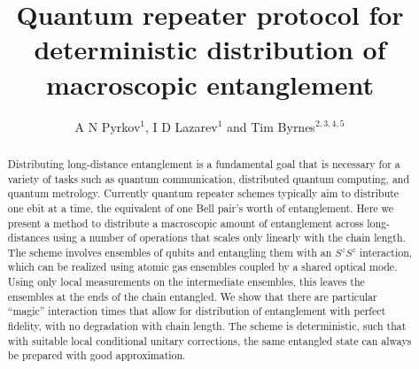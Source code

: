 \documentclass[12pt]{iopart}
\begin{document}
\title{Quantum repeater protocol for deterministic distribution of macroscopic entanglement}

\author{A N Pyrkov$^1$, I D Lazarev$^1$ and Tim Byrnes$^{2, 3, 4, 5}$}
\address{$^1$ Federal Research Center of Problems of Chemical Physics and Medicinal Chemistry RAS, Acad. Semenov av. 1, Chernogolovka, Moscow region, Russia, 142432}

\address{$^2$New York University Shanghai, 567 West Yangsi Road, Shanghai, 200126, China; NYU-ECNU Institute of Physics at NYU Shanghai, 3663 Zhongshan Road North, Shanghai 200062, China; Shanghai Frontiers Science Center of Artificial Intelligence and Deep Learning, NYU Shanghai, 567 West Yangsi Road, Shanghai, 200126, China.}
\address{$^3$State Key Laboratory of Precision Spectroscopy, School of Physical and Material Sciences, East China Normal University, Shanghai 200062, China}
\address{$^4$Center for Quantum and Topological Systems (CQTS), NYUAD Research Institute, New York University Abu Dhabi, UAE.}
\address{$^5$Department of Physics, New York University, New York, NY 10003, USA}

\date{}%


\begin{abstract}
Distributing long-distance entanglement is a fundamental goal that is necessary for a variety of tasks such as quantum communication, distributed quantum computing, and quantum metrology.  Currently quantum repeater schemes typically  aim to distribute one ebit at a time, the equivalent of one Bell pair's worth of entanglement.  Here we present a method to distribute a macroscopic amount of entanglement across long-distances using a number of operations that scales only linearly with the chain length.  The scheme involves ensembles of qubits and entangling them with an $S^z S^z$ interaction, which can be realized using atomic gas ensembles coupled by a shared optical mode. Using only local measurements on the intermediate ensembles, this leaves the ensembles at the ends of the chain entangled.  We show that there are particular ``magic'' interaction times that allow for distribution of entanglement with perfect fidelity, with no degradation with chain length.  The scheme is deterministic, such that with suitable local conditional unitary corrections, the same entangled state can always be prepared with good approximation.  
\end{abstract}
\end{document}
